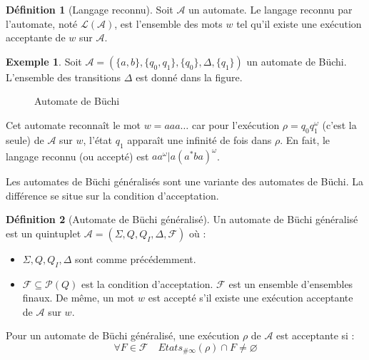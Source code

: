 \documentclass[12pt,a4paper]{article}
\theoremstyle{plain}
\theoremstyle{definition}
\newtheorem{defi}{Définition}
\newtheorem{ex}{Exemple}
\begin{document}
\begin{defi}[Langage reconnu]
  Soit $\mathcal{A}$ un automate.
  Le langage reconnu par l'automate, noté $\mathcal{L}(\mathcal{A})$, est l'ensemble des mots $w$ tel qu'il existe une exécution acceptante de $w$ sur $\mathcal{A}$.
\end{defi}

\begin{ex}
  Soit $\mathcal{A}=(\{a,b\}, \{q_0, q_1\}, \{q_0\}, \Delta, \{q_1\})$ un automate de Büchi.
  L'ensemble des transitions $\Delta$ est donné dans la figure.
  \begin{figure}[h]
    \centering
    \caption{Automate de Büchi}
  \end{figure}
  
  Cet automate reconnaît le mot $w = aaa\dots$ car pour l'exécution $\rho = q_0q_1^\omega$ (c'est la seule) de $\mathcal{A}$ sur $w$, l'état $q_1$ apparaît une infinité de fois dans $\rho$.
  En fait, le langage reconnu (ou accepté) est $aa^\omega | a(a^*ba)^\omega$.
\end{ex}

Les automates de Büchi généralisés sont une variante des automates de Büchi.
La différence se situe sur la condition d'acceptation.
\begin{defi}[Automate de Büchi généralisé]
  Un automate de Büchi généralisé est un quintuplet $\mathcal{A}=(\Sigma, Q, Q_I, \Delta, \mathscr{F})$ où :
  \begin{itemize}
  \item $\Sigma, Q, Q_I, \Delta$ sont comme précédemment.
  \item $\mathscr{F} \subseteq \mathcal{P}(Q)$ est la condition d'acceptation.
    $\mathscr{F}$ est un ensemble d'ensembles finaux. De même, un mot $w$ est accepté s'il existe une exécution acceptante de $\mathcal{A}$ sur $w$.
  \end{itemize}
  
\end{defi}
Pour un automate de Büchi généralisé, une exécution $\rho$ de $\mathcal{A}$ est acceptante si :
\[
  \forall F \in \mathscr{F} \quad Etats_{\#\infty}(\rho) \cap F \neq \varnothing
\]
\end{document}
